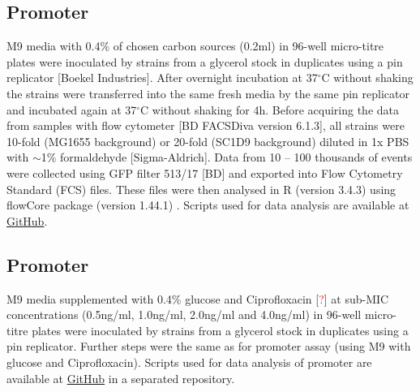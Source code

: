 \subsection{Promoter }
M9 media with 0.4\% of chosen carbon sources (0.2ml) in 96-well micro-titre plates were inoculated by strains from a glycerol stock in duplicates using a pin replicator [Boekel Industries].
After overnight incubation at 37$^{\circ}$C without shaking the strains were transferred into the same fresh media by the same pin replicator and incubated again at 37$^{\circ}$C without shaking for 4h.
Before acquiring the data from samples with flow cytometer [BD FACSDiva version 6.1.3], all strains were 10-fold (MG1655 background) or 20-fold (SC1\textunderscore D9 background) diluted in 1x PBS with $\sim$1\% formaldehyde [Sigma-Aldrich].
Data from 10 -- 100 thousands of events were collected using GFP filter 513/17 [BD] and exported into Flow Cytometry Standard (FCS) files.
These files were then analysed in R (version 3.4.3) using flowCore package (version 1.44.1) \cite{hahne2009flowcore}.
Scripts used for data analysis are available at \href{https://github.com/marketavlkova/LacZ_FC}{GitHub}.

\subsection{Promoter }
M9 media supplemented with 0.4\% glucose and Ciprofloxacin [\textcolor{red}{?}] at sub-MIC concentrations (0.5ng/ml, 1.0ng/ml, 2.0ng/ml and 4.0ng/ml) in 96-well micro-titre plates were inoculated by strains from a glycerol stock in duplicates using a pin replicator.
Further steps were the same as for  promoter assay (using M9 with glucose and Ciprofloxacin).
Scripts used for data analysis of  promoter are available at \href{https://github.com/marketavlkova/RecA}{GitHub} in a separated repository.

\shorthandon{-} 
